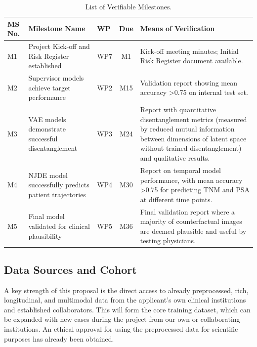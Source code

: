 \documentclass[11pt, a4paper]{article}
\begin{document}
\begin{table}[H]
    \centering
    \caption{List of Verifiable Milestones.}
    \label{tab:milestones}
    \small
    \begin{tabular}{lp{5.5cm}lcp{5cm}}
        \toprule
        \textbf{MS No.} & \textbf{Milestone Name} & \textbf{WP} & \textbf{Due} & \textbf{Means of Verification} \\
        \midrule
        M1 & Project Kick-off and Risk Register established & WP7 & M1 & Kick-off meeting minutes; Initial Risk Register document available. \\
        M2 & Supervisor models achieve target performance & WP2 & M15 & Validation report showing mean accuracy >0.75 on internal test set. \\
        M3 & VAE models demonstrate successful disentanglement & WP3 & M24 & Report with quantitative disentanglement metrics (measured by reduced mutual information between dimensions of latent space without trained disentanglement) and qualitative results. \\
        M4 & NJDE model successfully predicts patient trajectories & WP4 & M30 & Report on temporal model performance, with mean accuracy >0.75 for predicting TNM and PSA at different time points. \\
        M5 & Final model validated for clinical plausibility & WP5 & M36 & Final validation report where a majority of counterfactual images are deemed plausible and useful by testing physicians. \\
        \bottomrule
    \end{tabular}
\end{table}

\subsection{Data Sources and Cohort}
A key strength of this proposal is the direct access to already preprocessed, rich, longitudinal, and multimodal data from the applicant's own clinical institutions and established collaborators. This will form the core training dataset, which can be expanded with new cases during the project from our own or collaborating institutions. An ethical approval for using the preprocessed data for scientific purposes has already been obtained.
\end{document}
